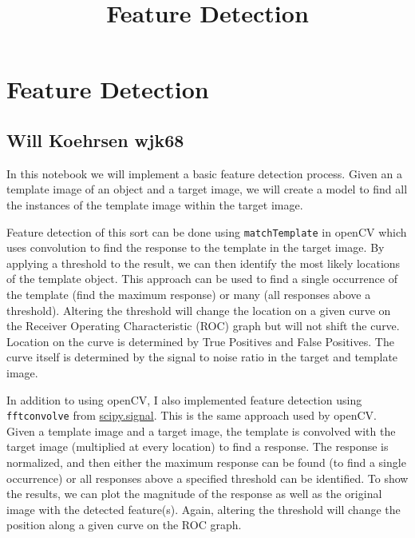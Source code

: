 \documentclass[11pt]{article}
\title{Feature Detection}
\begin{document}
    
    
    \maketitle
    
    

    
    \hypertarget{feature-detection}{%
\section{Feature Detection}\label{feature-detection}}

\hypertarget{will-koehrsen-wjk68}{%
\subsection{Will Koehrsen wjk68}\label{will-koehrsen-wjk68}}

In this notebook we will implement a basic feature detection process.
Given an a template image of an object and a target image, we will
create a model to find all the instances of the template image within
the target image.

Feature detection of this sort can be done using \texttt{matchTemplate}
in openCV which uses convolution to find the response to the template in
the target image. By applying a threshold to the result, we can then
identify the most likely locations of the template object. This approach
can be used to find a single occurrence of the template (find the
maximum response) or many (all responses above a threshold). Altering
the threshold will change the location on a given curve on the Receiver
Operating Characteristic (ROC) graph but will not shift the curve.
Location on the curve is determined by True Positives and False
Positives. The curve itself is determined by the signal to noise ratio
in the target and template image.

In addition to using openCV, I also implemented feature detection using
\texttt{fftconvolve} from
\href{https://docs.scipy.org/doc/scipy/reference/signal.html}{scipy.signal}.
This is the same approach used by openCV. Given a template image and a
target image, the template is convolved with the target image
(multiplied at every location) to find a response. The response is
normalized, and then either the maximum response can be found (to find a
single occurrence) or all responses above a specified threshold can be
identified. To show the results, we can plot the magnitude of the
response as well as the original image with the detected feature(s).
Again, altering the threshold will change the position along a given
curve on the ROC graph.
\end{document}
